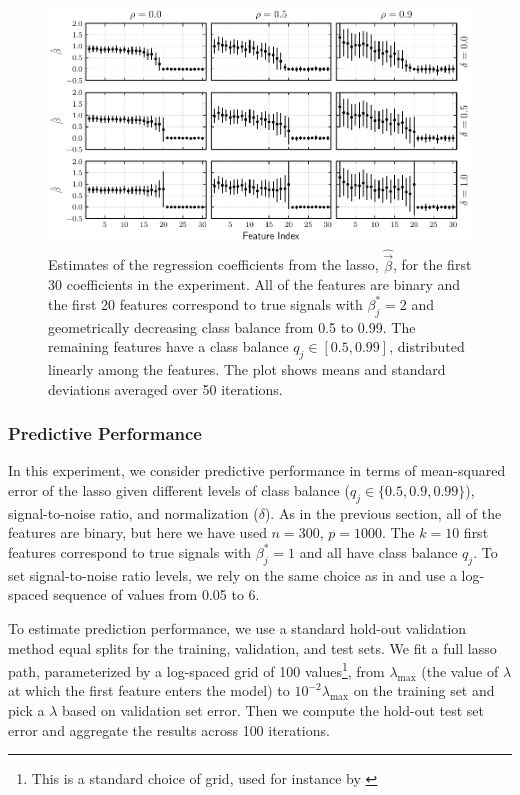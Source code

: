 \begin{figure}[htpb]
  \centering
  \includegraphics[]{plots/binary_decreasing.pdf}
  \caption{%
    Estimates of the regression coefficients from the lasso, \(\hat{\vec{\beta}}\), for the first 30 coefficients in the experiment. All of the features are binary and the first 20 features correspond to true signals with \(\beta_j^* = 2\) and geometrically decreasing class balance from 0.5 to 0.99. The remaining features have a class balance \(q_j \in [0.5, 0.99]\), distributed linearly among the features. The plot shows means and standard deviations averaged over 50 iterations.}
  \label{fig:binary-decreasing}
\end{figure}

\subsubsection{Predictive Performance}\label{sec:predictive-performance}

In this experiment, we consider predictive performance in terms of mean-squared error of
the lasso given different levels of class balance (\(q_j \in \{0.5, 0.9, 0.99\}\)),
signal-to-noise ratio, and normalization (\(\delta\)). As in the previous section, all of
the features are binary, but here we have used \(n=300\), \(p = \num{1000}\). The \(k=10\)
first features correspond to true signals with \(\beta^*_j = 1\) and all have class balance
\(q_j\). To set signal-to-noise ratio levels, we rely on the same choice as in
\citet{hastie2020} and use a log-spaced sequence of values from 0.05 to 6.

To estimate prediction performance, we use a standard hold-out validation method equal
splits for the training, validation, and test sets. We fit a full lasso path, parameterized
by a log-spaced grid of 100 values\footnote{This is a standard choice of grid, used for
  instance by \citet{friedman2010}}, from \(\lambda_\text{max}\) (the value of \(\lambda\) at
which the first feature enters the model) to \(10^{-2}\lambda_\text{max}\) on the training
set and pick a \(\lambda\) based on validation set error. Then we compute the hold-out test
set error and aggregate the results across 100 iterations.

